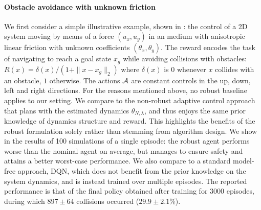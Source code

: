 \documentclass{article}
\begin{document}
\paragraph{Obstacle avoidance with unknown friction}
We first consider a simple illustrative example, shown in : the control of a 2D system %
moving by means of a force $(u_x, u_y)$ in an medium with anisotropic linear friction with unknown coefficients $(\theta_x, \theta_y)$.
The reward encodes the task of navigating to reach a goal state $x_g$ while avoiding collisions with obstacles: $R(x) = \delta(x)/(1 + \|x - x_g\|_2)$  where $\delta(x)$ is $0$ whenever $x$ collides with an obstacle, $1$ otherwise. The actions $\mathcal{A}$ are constant controls in the up, down, left and right directions.
For the reasons mentioned above, no robust baseline applies to our setting. We compare  to the non-robust adaptive control approach that plans with the estimated dynamics $\theta_{N,\lambda}$, and thus enjoys the same prior knowledge of dynamics structure and reward. This highlights the benefits of the robust formulation solely rather than stemming from algorithm design.
We show in  the results of 100 simulations of a single episode: the robust agent performs worse than the nominal agent on average, but manages to ensure safety and attains a better worst-case performance. We also compare to a standard model-free approach, DQN, which does not benefit from the prior knowledge on the system dynamics, and is instead trained over multiple episodes. The reported performance is that of the final policy obtained after training for 3000 episodes, during which $897\pm64$ collisions occurred ($29.9\pm2.1$\%).
\end{document}

